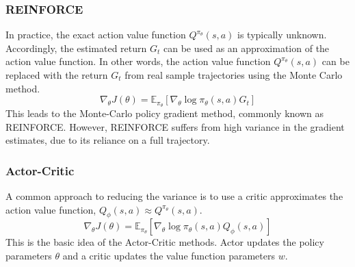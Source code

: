 \subsubsection{REINFORCE}

In practice, the exact action value function $Q^{\pi_\theta} (s, a)$ is typically unknown.
Accordingly, the estimated return $G_t$ can be used as an approximation of the action value function.
In other words, the action value function $Q^{\pi_\theta} (s, a)$ can be replaced with the return $G_t$ from real sample trajectories using the Monte Carlo method.
\begin{equation}
  \nabla_\theta J(\theta) = \mathbb{E}_{\pi_\theta}[\nabla_\theta \log \pi_\theta(s, a) G_t]
\end{equation}
This leads to the Monte-Carlo policy gradient method, commonly known as REINFORCE.
However, REINFORCE suffers from high variance in the gradient estimates, due to its reliance on a full trajectory.

\subsubsection{Actor-Critic}

A common approach to reducing the variance is to use a critic approximates the action value function, $Q_\phi(s, a) \approx Q^{\pi_\theta}(s, a)$.
\begin{equation}
  \nabla_\theta J(\theta) = \mathbb{E}_{\pi_\theta} [\nabla_\theta \log \pi_\theta(s, a) Q_\phi(s, a)]
\end{equation}
This is the basic idea of the Actor-Critic methods.
Actor updates the policy parameters $\theta$ and a critic updates the value function parameters $w$.

